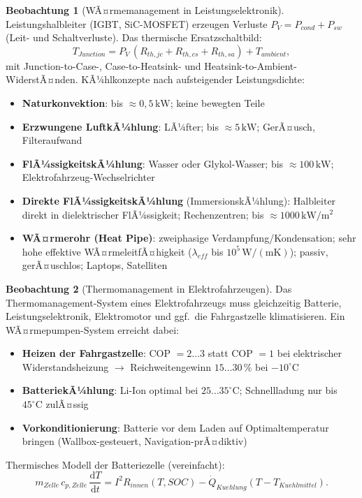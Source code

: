﻿\documentclass[a4paper,12pt]{report}
\theoremstyle{definition}
\newtheorem{beobachtung}{Beobachtung}
\begin{document}
\begin{beobachtung}[WÃ¤rmemanagement in Leistungselektronik]
Leistungshalbleiter (IGBT, SiC-MOSFET) erzeugen Verluste
$P_V = P_{cond} + P_{sw}$ (Leit- und Schaltverluste).
Das thermische Ersatzschaltbild:
\[
  T_{Junction} = P_V\,(R_{th,jc} + R_{th,cs} + R_{th,sa}) + T_{ambient},
\]
mit Junction-to-Case-, Case-to-Heatsink- und Heatsink-to-Ambient-WiderstÃ¤nden.
KÃ¼hlkonzepte nach aufsteigender Leistungsdichte:
\begin{itemize}
    \item[-] \textbf{Naturkonvektion}: bis $\approx 0{,}5\,\mathrm{kW}$; keine bewegten Teile
    \item[-] \textbf{Erzwungene LuftkÃ¼hlung}: LÃ¼fter; bis $\approx 5\,\mathrm{kW}$;
          GerÃ¤usch, Filteraufwand
    \item[-] \textbf{FlÃ¼ssigkeitskÃ¼hlung}: Wasser oder Glykol-Wasser;
          bis $\approx 100\,\mathrm{kW}$; Elektrofahrzeug-Wechselrichter
    \item[-] \textbf{Direkte FlÃ¼ssigkeitskÃ¼hlung} (ImmersionskÃ¼hlung):
          Halbleiter direkt in dielektrischer FlÃ¼ssigkeit; Rechenzentren;
          bis $\approx 1000\,\mathrm{kW/m^2}$
    \item[-] \textbf{WÃ¤rmerohr (Heat Pipe)}: zweiphasige Verdampfung/Kondensation;
          sehr hohe effektive WÃ¤rmeleitfÃ¤higkeit ($\lambda_{eff}$ bis $10^5\,\mathrm{W/(mK)}$);
          passiv, gerÃ¤uschlos; Laptops, Satelliten
\end{itemize}
\end{beobachtung}


\begin{beobachtung}[Thermomanagement in Elektrofahrzeugen]
Das Thermomanagement-System eines Elektrofahrzeugs muss gleichzeitig
Batterie, Leistungselektronik, Elektromotor und ggf.\ die Fahrgastzelle klimatisieren.
Ein WÃ¤rmepumpen-System erreicht dabei:
\begin{itemize}
    \item[-] \textbf{Heizen der Fahrgastzelle}: COP $= 2\ldots3$
          statt COP $= 1$ bei elektrischer Widerstandsheizung
          $\to$ Reichweitengewinn $15\ldots30\,\%$ bei $-10^\circ\mathrm{C}$
    \item[-] \textbf{BatteriekÃ¼hlung}: Li-Ion optimal bei $25\ldots35^\circ\mathrm{C}$;
          Schnellladung nur bis $45^\circ\mathrm{C}$ zulÃ¤ssig
    \item[-] \textbf{Vorkonditionierung}: Batterie vor dem Laden
          auf Optimaltemperatur bringen (Wallbox-gesteuert, Navigation-prÃ¤diktiv)
\end{itemize}
Thermisches Modell der Batteriezelle (vereinfacht):
\[
  m_{Zelle}\,c_{p,Zelle}\,\frac{\mathrm{d}T}{\mathrm{d}t}
  = I^2 R_{innen}(T,SOC) - \dot{Q}_{Kuehlung}(T - T_{Kuehlmittel}).
\]
\end{beobachtung}
\end{document}
